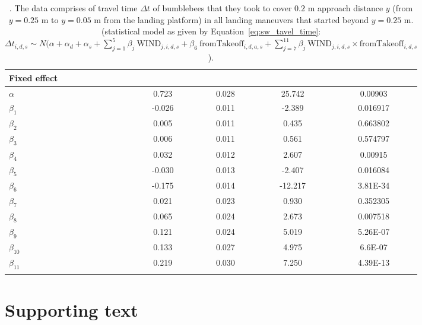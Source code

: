 \begin{table}\centering
	\captionsetup{width=\textwidth, justification=justified}
	\caption{. The data comprises of travel time $\Delta t$ of bumblebees that they took to cover $0.2$ m approach distance $y$ (from $y = 0.25$ m to $y = 0.05$ m from the landing platform) in all landing maneuvers that started beyond $y = 0.25$ m. (statistical model as given by Equation~\ref{eq:sw_tavel_time}: $\Delta t_{i,d,s} \sim N(\alpha + \alpha_d + \alpha_s + \sum_{j=1}^{5} \beta_j~\textrm{WIND}_{j,i,d,s} + \beta_6~\textrm{fromTakeoff}_{i,d,a,s} + \sum_{j=7}^{11} \beta_j~\textrm{WIND}_{j,i,d,s} \times \textrm{fromTakeoff}_{i,d,s}$).}
	\label{tb:sw_travel_time}
	\begin{tabular}{p{3cm}CCCC}
		\toprule
		Fixed effect             &  &  &  &  \\
		\midrule
		$\alpha$     & 0.723  & 0.028 & 25.742  & 0.00903  \\
		$\beta_1$    & -0.026 & 0.011 & -2.389  & 0.016917 \\
		$\beta_2$    & 0.005  & 0.011 & 0.435   & 0.663802 \\
		$\beta_3$    & 0.006  & 0.011 & 0.561   & 0.574797 \\
		$\beta_4$    & 0.032  & 0.012 & 2.607   & 0.00915  \\
		$\beta_5$    & -0.030 & 0.013 & -2.407  & 0.016084 \\
		$\beta_6$    & -0.175 & 0.014 & -12.217 & 3.81E-34 \\
		$\beta_7$    & 0.021  & 0.023 & 0.930   & 0.352305 \\
		$\beta_8$    & 0.065  & 0.024 & 2.673   & 0.007518 \\
		$\beta_9$    & 0.121  & 0.024 & 5.019   & 5.26E-07 \\
		$\beta_{10}$ & 0.133  & 0.027 & 4.975   & 6.6E-07  \\
		$\beta_{11}$ & 0.219  & 0.030 & 7.250   & 4.39E-13\\   
		
		\\
		
		\bottomrule         
	\end{tabular}
\end{table}


\newpage
\section{Supporting text}
\label{sec:s4_text}
